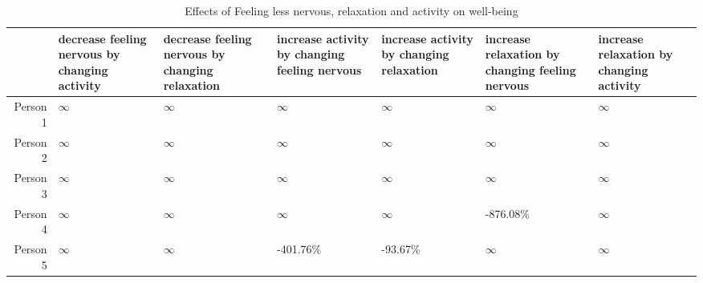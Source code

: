 \begin{table*}[ht]
\centering
\begin{tabular}{rllllll}
  \toprule
 & decrease feeling nervous by changing activity & decrease feeling nervous by changing relaxation & increase activity by changing feeling nervous & increase activity by changing relaxation & increase relaxation by changing feeling nervous  & increase relaxation by changing activity \\ 
  \midrule
Person 1 & $\infty$ & $\infty$ & $\infty$ & $\infty$ & $\infty$ & $\infty$ \\ 
  Person 2 & $\infty$ & $\infty$ & $\infty$ & $\infty$ & $\infty$ & $\infty$ \\ 
  Person 3 & $\infty$ & $\infty$ & $\infty$ & $\infty$ & $\infty$ & $\infty$ \\ 
  Person 4 & $\infty$ & $\infty$ & $\infty$ & $\infty$ & -876.08\% & $\infty$ \\ 
  Person 5 & $\infty$ & $\infty$ & -401.76\% & -93.67\% & $\infty$ & $\infty$ \\ 
   \bottomrule
\end{tabular}
\caption{Effects of Feeling less nervous, relaxation and activity on well-being} 
\label{tab:percentage_effects_in_aira}
\end{table*}
